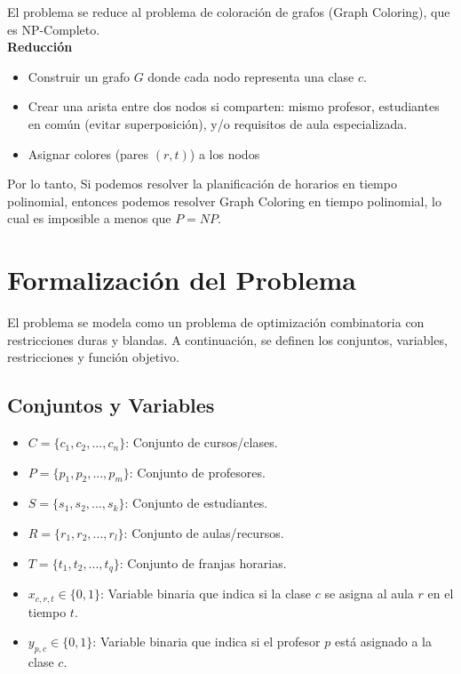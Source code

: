 \documentclass[12pt, a4paper]{article}
\begin{document}
El problema se reduce al problema de coloración de grafos (Graph Coloring), que es NP-Completo.\\
\textbf{Reducción}
\begin{itemize}
    \item Construir un grafo $G$ donde cada nodo representa una clase $c$.
    \item Crear una arista entre dos nodos si comparten: mismo profesor, estudiantes en común (evitar superposición), y/o requisitos de aula especializada.
    \item Asignar colores (pares $(r,t)$) a los nodos
\end{itemize}
Por lo tanto, Si podemos resolver la planificación de horarios en tiempo polinomial, entonces podemos resolver Graph Coloring en tiempo polinomial, lo cual es imposible a menos que $P = NP$.

\section{Formalización del Problema}
El problema se modela como un problema de optimización combinatoria con restricciones duras y blandas. A continuación, se definen los conjuntos, variables, restricciones y función objetivo.

\subsection{Conjuntos y Variables}
\begin{itemize}
    \item \( C = \{c_1, c_2, ..., c_n\} \): Conjunto de cursos/clases.
    \item \( P = \{p_1, p_2, ..., p_m\} \): Conjunto de profesores.
    \item \( S = \{s_1, s_2, ..., s_k\} \): Conjunto de estudiantes.
    \item \( R = \{r_1, r_2, ..., r_l\} \): Conjunto de aulas/recursos.
    \item \( T = \{t_1, t_2, ..., t_q\} \): Conjunto de franjas horarias.
    \item \( x_{c, r, t} \in \{0, 1\} \): Variable binaria que indica si la clase \( c \) se asigna al aula \( r \) en el tiempo \( t \).
    \item \( y_{p, c} \in \{0, 1\} \): Variable binaria que indica si el profesor \( p \) está asignado a la clase \( c \).
\end{itemize}
\end{document}
